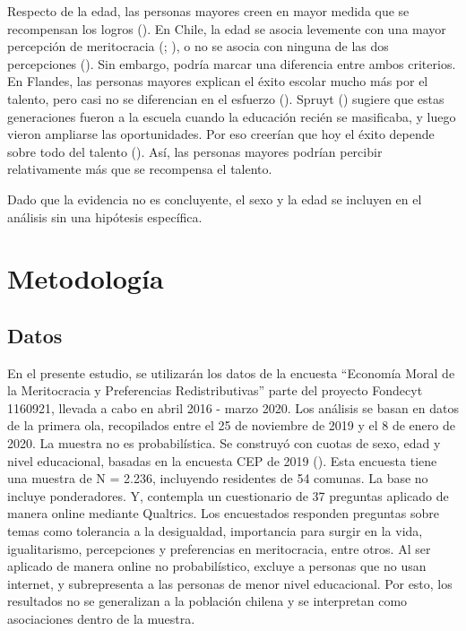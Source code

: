 \documentclass[
  spanish,
  a4paper,
  oneside]{scrbook}
\begin{document}
Respecto de la edad, las personas mayores creen en mayor medida que se
recompensan los logros
(). En Chile, la edad se asocia levemente con una mayor percepción
de meritocracia (; ), o no se asocia con ninguna de las dos
percepciones (). Sin embargo, podría marcar una diferencia entre ambos
criterios. En Flandes, las personas mayores explican el éxito escolar
mucho más por el talento, pero casi no se diferencian en el esfuerzo
(). Spruyt
()
sugiere que estas generaciones fueron a la escuela cuando la educación
recién se masificaba, y luego vieron ampliarse las oportunidades. Por
eso creerían que hoy el éxito depende sobre todo del talento
(). Así, las personas mayores podrían percibir relativamente
más que se recompensa el talento.

Dado que la evidencia no es concluyente, el sexo y la edad se incluyen
en el análisis sin una hipótesis específica.


\chapter{Metodología}\label{metodologuxeda-1}

\section{Datos}\label{datos-1}

En el presente estudio, se utilizarán los datos de la encuesta
``Economía Moral de la Meritocracia y Preferencias Redistributivas''
parte del proyecto Fondecyt 1160921, llevada a cabo en abril 2016 -
marzo 2020. Los análisis se basan en datos de la primera ola,
recopilados entre el 25 de noviembre de 2019 y el 8 de enero de 2020. La
muestra no es probabilística. Se construyó con cuotas de sexo, edad y
nivel educacional, basadas en la encuesta CEP de 2019
(). Esta encuesta tiene una muestra de N = 2.236,
incluyendo residentes de 54 comunas. La base no incluye ponderadores. Y,
contempla un cuestionario de 37 preguntas aplicado de manera online
mediante Qualtrics. Los encuestados responden preguntas sobre temas como
tolerancia a la desigualdad, importancia para surgir en la vida,
igualitarismo, percepciones y preferencias en meritocracia, entre otros.
Al ser aplicado de manera online no probabilístico, excluye a personas
que no usan internet, y subrepresenta a las personas de menor nivel
educacional. Por esto, los resultados no se generalizan a la población
chilena y se interpretan como asociaciones dentro de la muestra.
\end{document}
